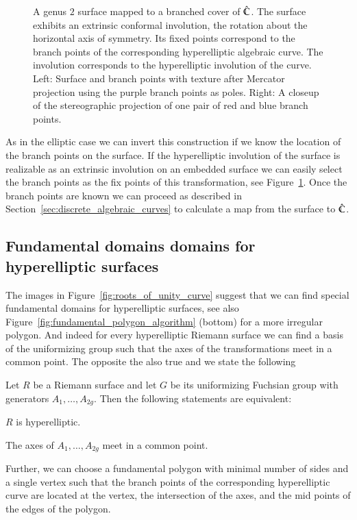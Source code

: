 \documentclass[Thesis]{subfiles}
\begin{document}
\begin{figure} 
\centering
{}
\caption{
A genus $2$ surface mapped to a branched cover of $\hat{\mathbb C}$. 
The surface exhibits an extrinsic conformal involution, the rotation about the horizontal axis of symmetry. 
Its fixed points correspond to the branch points of the corresponding hyperelliptic algebraic curve.
The involution corresponds to the hyperelliptic involution of the curve.  
Left: Surface and branch points with texture after Mercator projection using the purple
branch points as poles. 
Right: A closeup of the stereographic projection of one pair of red and blue branch points.
} 
\label{fig:genus2_branched} 
\end{figure}

As in the elliptic case we can invert this construction if we know the location of the branch points on the surface.
If the hyperelliptic involution of the surface is realizable as an extrinsic involution on an embedded surface we can easily select the branch points as the fix points of this transformation, see Figure~\ref{fig:genus2_branched}. 
Once the branch points are known we can proceed as described in Section~\ref{sec:discrete_algebraic_curves} to calculate a map from the surface to $\hat{\mathbb C}$.

\subsection{Fundamental domains domains for hyperelliptic surfaces}
\label{sec:hyperelliptic_domain}

The images in Figure~\ref{fig:roots_of_unity_curve} suggest that we can find special fundamental domains for hyperelliptic surfaces, see also Figure~\ref{fig:fundamental_polygon_algorithm} (bottom) for a more irregular polygon. 
And indeed for every hyperelliptic Riemann surface we can find a basis of the uniformizing group such that the axes of the transformations meet in a common point.
The opposite the also true and we state the following

\begin{theorem}
Let $R$ be a Riemann surface and let $G$ be its uniformizing Fuchsian group with generators $A_1,\ldots,A_{2g}$.
Then the following statements are equivalent:
\begin{compactitem}
\item $R$ is hyperelliptic.
\item The axes of $A_1,\ldots,A_{2g}$ meet in a common point.
\end{compactitem}
Further, we can choose a fundamental polygon with minimal number of sides and a single vertex such that the branch points of the corresponding hyperelliptic curve are located at the vertex, the intersection of the axes, and the mid points of the edges of the polygon.
\end{theorem}
\end{document}
